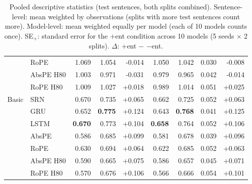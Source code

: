 \begin{table}[t]
\begin{tabular}{@{}llrrrrrrr@{}}
 & RoPE & 1.069 & 1.054 & -0.014 & 1.050 & 1.042 & 0.030 & -0.008 \\
 & AbsPE H80 & 1.003 & 0.971 & -0.031 & 0.979 & 0.965 & 0.042 & -0.014 \\
 & RoPE H80 & 1.009 & 1.027 & +0.018 & 0.989 & 1.014 & 0.051 & +0.025 \\
\addlinespace
Basic & SRN & 0.670 & 0.735 & +0.065 & 0.662 & 0.725 & 0.052 & +0.063 \\
 & GRU & 0.652 & \textbf{0.775} & +0.124 & 0.643 & \textbf{0.768} & 0.041 & +0.125 \\
 & LSTM & \textbf{0.670} & 0.773 & +0.104 & \textbf{0.658} & 0.764 & 0.052 & +0.106 \\
 & AbsPE & 0.586 & 0.685 & +0.099 & 0.581 & 0.678 & 0.039 & +0.096 \\
 & RoPE & 0.630 & 0.694 & +0.064 & 0.622 & 0.685 & 0.052 & +0.063 \\
 & AbsPE H80 & 0.590 & 0.665 & +0.075 & 0.586 & 0.657 & 0.045 & +0.071 \\
 & RoPE H80 & 0.570 & 0.676 & +0.106 & 0.566 & 0.666 & 0.054 & +0.101 \\
\bottomrule
\end{tabular}
\caption{\small Pooled descriptive statistics (test sentences, both splits combined). Sentence-level: mean weighted by observations (splits with more test sentences count more). Model-level: mean weighted equally per model (each of 10 models counts once). SE$_{+}$: standard error for the $+$ent condition across 10 models (5 seeds $\times$ 2 splits). $\Delta$: $+$ent $-$ $-$ent.}
\label{tab:descriptive_pooled_test}
\end{table}
